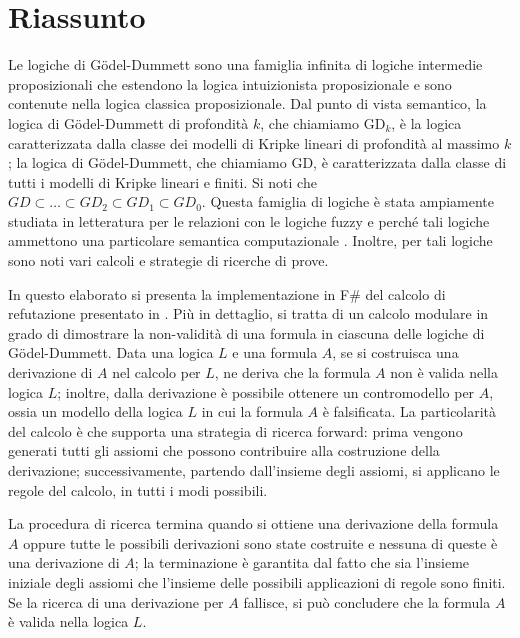 \documentclass{oist}
\begin{document}
\section*{Riassunto}

Le logiche di G\"odel-Dummett sono una famiglia infinita di logiche
intermedie proposizionali che estendono la logica intuizionista
proposizionale
e sono contenute nella logica classica proposizionale.
Dal punto di vista semantico, la logica di  G\"odel-Dummett di profondit\`a
$k$,
che chiamiamo $\mathrm{GD}_k$,
\`e la logica caratterizzata dalla classe dei modelli di Kripke lineari
di profondit\`a
al massimo $k$; la logica di  G\"odel-Dummett,  che chiamiamo $\mathrm{GD}$,
\`e caratterizzata dalla classe di tutti i  modelli di Kripke lineari e finiti.
Si noti che $GD \subset \dots \subset GD_2 \subset GD_1 \subset GD_0$.
Questa famiglia di logiche \`e stata ampiamente studiata in letteratura
per le relazioni con le logiche
fuzzy \cite{Hajek:98} e perch\'e tali logiche ammettono una particolare semantica computazionale
\cite{AscCiaGen:2017,Avron:91b}.
Inoltre, per tali logiche sono noti vari calcoli e strategie di ricerche di prove.

In questo elaborato si presenta la implementazione in F\# del calcolo di
refutazione
presentato in \cite{DBLP:conf/cilc/Fiorentini022}.
Pi\`u in dettaglio,
si tratta di un calcolo modulare in grado di dimostrare
la non-validit\`a di una formula in ciascuna delle logiche di
G\"odel-Dummett.
Data una logica $L$ e una formula $A$, se si costruisca una derivazione
di $A$ nel calcolo per $L$,
ne deriva che la formula $A$ non \`e valida nella logica $L$;
inoltre, dalla derivazione \`e possibile ottenere un contromodello per
$A$, ossia un modello
della logica $L$ in cui la formula $A$ \`e falsificata.
La particolarit\`a del calcolo \`e che supporta una strategia di ricerca
forward: prima vengono
generati tutti gli assiomi che possono contribuire alla costruzione
della derivazione;
successivamente, partendo dall'insieme degli assiomi, si applicano le
regole del calcolo, in tutti i modi possibili.

La procedura di ricerca termina quando si ottiene una derivazione della
formula $A$ oppure tutte le possibili derivazioni sono state costruite
e nessuna di queste \`e una derivazione di $A$; la terminazione \`e
garantita
dal fatto che sia l'insieme iniziale degli assiomi che l'insieme delle
possibili applicazioni di regole sono finiti.
Se la ricerca di una derivazione per $A$ fallisce,
si pu\`o concludere che la formula $A$ \`e valida nella logica $L$.
\end{document}
